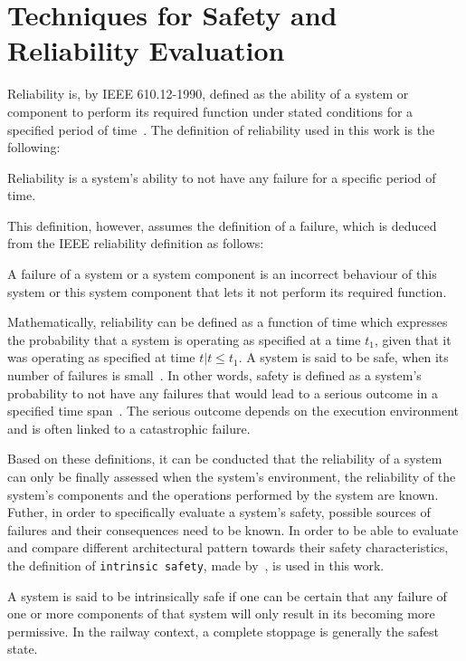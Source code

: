 \section{Techniques for Safety and Reliability Evaluation}
Reliability is, by IEEE 610.12-1990, defined as the ability of a system or component to perform its required function under stated conditions for a specified period of time~\cite{ieee610.12}.
The definition of reliability used in this work is the following:

\begin{definition}
Reliability is a system's ability to not have any failure for a specific period of time.
\end{definition}

This definition, however, assumes the definition of a failure, which is deduced from the IEEE reliability definition as follows:

\begin{definition}
A failure of a system or a system component is an incorrect behaviour of this system or this system component that lets it not perform its required function.
\end{definition}

Mathematically, reliability can be defined as a function of time which expresses the probability that a system is operating as specified at a time $t_1$, given that it was operating as specified at time $t | t \leq t_1$.
A system is said to be safe, when its number of failures is small~\cite{HollnagelSafety}.
In other words, safety is defined as a system's probability to not have any failures that would lead to a serious outcome in a specified time span~\cite{GeffroyMotetDependableComputing}.
The serious outcome depends on the execution environment and is often linked to a catastrophic failure.

Based on these definitions, it can be conducted that the reliability of a system can only be finally assessed when the system's environment, the reliability of the system's components and the operations performed by the system are known.
Futher, in order to specifically evaluate a system's safety, possible sources of failures and their consequences need to be known.
In order to be able to evaluate and compare different architectural pattern towards their safety characteristics, the definition of \texttt{intrinsic safety}, made by~\cite{BoulangerStandards}, is used in this work.

\begin{definition}
A system is said to be intrinsically safe if one can be certain that any failure of one or more components of that system will only result in its becoming more permissive.
In the railway context, a complete stoppage is generally the safest state.
\label{def:intrinsic_safety}
\end{definition}

